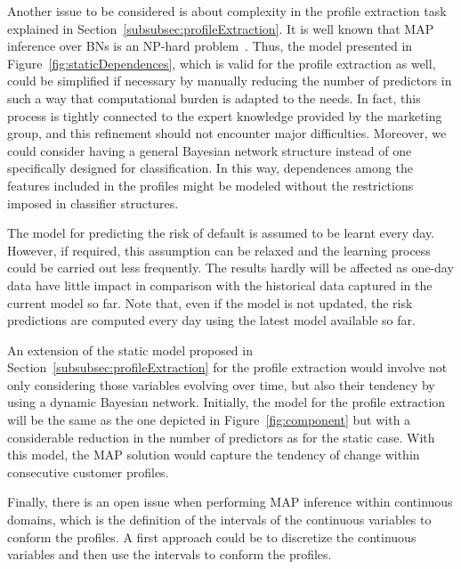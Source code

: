 Another issue to be considered is about complexity in the profile extraction task explained in Section~\ref{subsubsec:profileExtraction}. It is well known that MAP inference over BNs is an NP-hard problem~\cite{Shi94}. Thus, the model presented in Figure~\ref{fig:staticDependences}, which is valid for the profile extraction as well, could be simplified if necessary
by manually reducing the number of predictors in such a way that computational burden is adapted to the needs. In fact, this process is tightly connected to the expert knowledge provided by the marketing group, and this refinement should not encounter major difficulties. Moreover, we could consider having a general Bayesian network structure instead of one specifically designed for classification. In this way, dependences among the features included in the profiles might be modeled without the restrictions imposed in classifier structures.

The model for predicting the risk of default is assumed to be learnt every day. However, if required, this assumption can be relaxed and the learning process could be carried out less frequently. The results hardly will be affected as one-day data have little impact in comparison with the historical data captured in the current model so far. Note that, even if the model is not updated, the risk predictions are computed every day using the latest model available so far.

An extension of the static model proposed in Section~\ref{subsubsec:profileExtraction} for the profile extraction would involve not only considering those variables evolving over time, but also their tendency by using a dynamic Bayesian network. Initially, the model for the profile extraction will be the same as the one depicted in Figure~\ref{fig:component} but with a considerable reduction in the number of predictors as for the static case. With this model, the MAP solution would capture the tendency of change within consecutive customer profiles. 

Finally, there is an open issue when performing MAP inference within continuous domains, which is the definition of the intervals of the continuous variables to conform the profiles. A first approach could be to discretize the continuous variables and then use the intervals to conform the profiles. 





